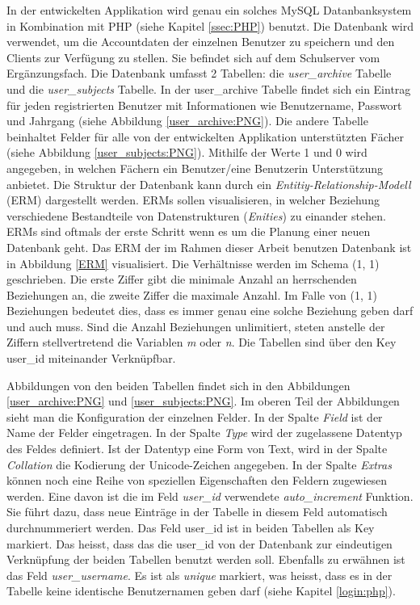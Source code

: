 \documentclass[a4paper,11pt]{report}
\begin{document}
				In der entwickelten Applikation wird genau ein solches MySQL Datanbanksystem in Kombination mit PHP (siehe Kapitel \ref{ssec:PHP}) benutzt. Die Datenbank wird verwendet, um die Accountdaten der einzelnen Benutzer zu speichern und den Clients zur Verfügung zu stellen. Sie befindet sich auf dem Schulserver vom Ergänzungsfach. Die Datenbank umfasst 2 Tabellen: die \emph{user\_archive} Tabelle und die \emph{user\_subjects} Tabelle. In der user\_archive Tabelle findet sich ein Eintrag für jeden registrierten Benutzer mit Informationen wie Benutzername, Passwort und Jahrgang (siehe Abbildung \ref{user_archive:PNG}). Die andere Tabelle beinhaltet Felder für alle von der entwickelten Applikation unterstützten Fächer (siehe Abbildung \ref{user_subjects:PNG}). Mithilfe der Werte 1 und 0 wird angegeben, in welchen Fächern ein Benutzer/eine Benutzerin Unterstützung anbietet. Die Struktur der Datenbank kann durch ein \emph{Entitiy-Relationship-Modell} (ERM) dargestellt werden. ERMs sollen visualisieren, in welcher Beziehung verschiedene Bestandteile von Datenstrukturen (\emph{Enities}) zu einander stehen. ERMs sind oftmals der erste Schritt wenn es um die Planung einer neuen Datenbank geht. Das ERM der im Rahmen dieser Arbeit benutzen Datenbank ist in Abbildung \ref{ERM} visualisiert. Die Verhältnisse werden im Schema (1, 1) geschrieben. Die erste Ziffer gibt die minimale Anzahl an herrschenden Beziehungen an, die zweite Ziffer die maximale Anzahl. Im Falle von (1, 1) Beziehungen bedeutet dies, dass es immer genau eine solche Beziehung geben darf und auch muss. Sind die Anzahl Beziehungen unlimitiert, steten anstelle der Ziffern stellvertretend die Variablen \emph{m} oder \emph{n}. Die Tabellen sind über den Key user\_id miteinander Verknüpfbar.\cite[S. 750]{IT-Handbuch} \cite{ERM} \cite{ERM2}
				
				Abbildungen von den beiden Tabellen findet sich in den Abbildungen \ref{user_archive:PNG} und \ref{user_subjects:PNG}. Im oberen Teil der Abbildungen sieht man die Konfiguration der einzelnen Felder. In der Spalte \emph{Field} ist der Name der Felder eingetragen. In der Spalte \emph{Type} wird der zugelassene Datentyp des Feldes definiert. Ist der Datentyp eine Form von Text, wird in der Spalte \emph{Collation} die Kodierung der Unicode-Zeichen angegeben. In der Spalte \emph{Extras} können noch eine Reihe von speziellen Eigenschaften den Feldern zugewiesen werden. Eine davon ist die im Feld \emph{user\_id} verwendete \emph{auto\_increment} Funktion. Sie führt dazu, dass neue Einträge in der Tabelle in diesem Feld automatisch durchnummeriert werden. Das Feld user\_id ist in beiden Tabellen als Key markiert. Das heisst, dass das die user\_id von der Datenbank zur eindeutigen Verknüpfung der beiden Tabellen benutzt werden soll. Ebenfalls zu erwähnen ist das Feld \emph{user\_username}. Es ist als \emph{unique} markiert, was heisst, dass es in der Tabelle keine identische Benutzernamen geben darf (siehe Kapitel \ref{login:php}). 
				
\end{document}
